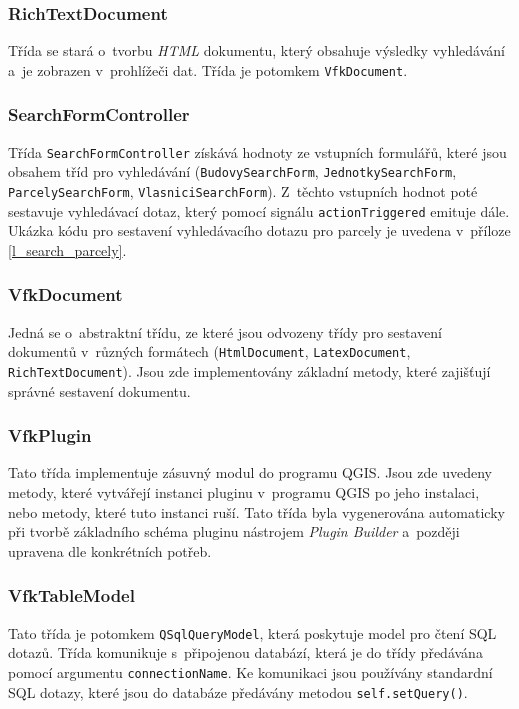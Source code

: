 \documentclass[a4paper,12pt,oneside]{book}
\begin{document}
\subsubsection{RichTextDocument}
Třída se stará o~tvorbu \textit{HTML} dokumentu, který obsahuje
výsledky vyhledávání a~je zobrazen v~prohlížeči dat. Třída je potomkem
\texttt{VfkDocument}.

\subsubsection{SearchFormController}
Třída \texttt{SearchFormController} získává hodnoty ze vstupních
formulářů, které jsou obsahem tříd pro vyhledávání
(\texttt{BudovySearchForm}, \texttt{JednotkySearchForm},
\texttt{Par\-celySearchForm}, \texttt{VlasniciSearchForm}). Z~těchto
vstupních hodnot poté sestavuje vyhledávací dotaz, který pomocí
signálu \texttt{actionTriggered} emituje dále. Ukázka kódu pro
sestavení vyhledávacího dotazu pro parcely je uvedena v~příloze
\ref{l_search_parcely}.

\subsubsection{VfkDocument}
\label{l_vfkDocument}
Jedná se o~abstraktní třídu, ze které jsou odvozeny třídy pro
sestavení dokumentů v~různých formátech (\texttt{HtmlDocument},
\texttt{LatexDocument}, \texttt{RichTextDocument}). Jsou zde
implementovány základní metody, které zajišťují správné sestavení
dokumentu.

\subsubsection{VfkPlugin}
Tato třída implementuje zásuvný modul do programu QGIS. Jsou zde
uvedeny metody, které vytvářejí instanci pluginu v~programu QGIS po
jeho instalaci, nebo metody, které tuto instanci ruší. Tato třída byla
vygenerována automaticky při tvorbě základního schéma pluginu
nástrojem \textit{Plugin Builder} a~později upravena dle konkrétních
potřeb.

\subsubsection{VfkTableModel}
Tato třída je potomkem \texttt{QSqlQueryModel}, která poskytuje
model pro čtení SQL dotazů. Třída komunikuje s~připojenou databází,
která je do třídy předávána pomocí argumentu
\texttt{connectionName}. Ke komunikaci jsou používány standardní SQL
dotazy, které jsou do databáze předávány metodou
\texttt{self.setQuery()}.
\end{document}
